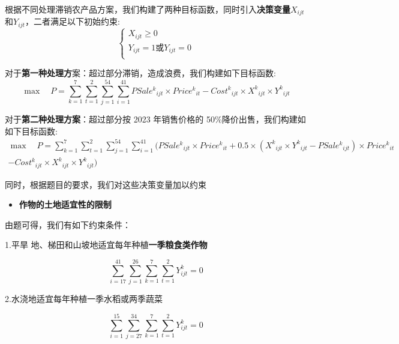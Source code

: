 \documentclass[withoutpreface,bwprint]{cumcmthesis} %
\begin{document}
根据不同处理滞销农产品方案，我们构建了两种目标函数，同时引入\textbf{决策变量}$X_{ijt}$和$Y_{ijt}$，二者满足以下初始约束:
\begin{equation}
	\begin{cases}
		X_{ijt}\geqslant 0\\
		Y_{ijt}=1\text{或}Y_{ijt}=0\\
	\end{cases}
\end{equation}

对于\textbf{第一种处理方}案：超过部分滞销，造成浪费，我们构建如下目标函数:
\begin{equation}
\max \quad P=\sum_{k=1}^7{\sum_{t=1}^2{\sum_{j=1}^{54}{\sum_{i=1}^{41}{{PSale^k}_{ijt}\times {Price^k}_{it}-{Cost^k}_{ijt}}\times {X^k}_{ijt}\times {Y^k}_{ijt}}}}
\end{equation}

对于\textbf{第}\textbf{二种处理方案}：超过部分按 2023 年销售价格的 50$\%$降价出售，我们构建如如下目标函数:
\begin{equation}
	\begin{split}
\max \quad P=\sum_{k=1}^7{\sum_{t=1}^2{\sum_{j=1}^{54}{\sum_{i=1}^{41}{(}}}}{PSale^k}_{ijt}\times {Price^k}_{it}+0.5\times ({X^k}_{ijt}\times {Y^k}_{ijt}-{PSale^k}_{ijt})\times {Price^k}_{it}
\\
-{Cost^k}_{ijt}\times {X^k}_{ijt}\times {Y^k}_{ijt})
	\end{split}
\end{equation}

同时，根据题目的要求，我们对这些决策变量加以约束

\begin{itemize}
	\item \textbf{作物的土地适宜性的限制}
\end{itemize}

	由题可得，我们有如下约束条件：
	
	1.平旱
	地、梯田和山坡地适宜每年种植\textbf{一季粮食类作物}
	
	\begin{equation}
		\sum_{i=17}^{41}{\sum_{j=1}^{26}{\sum_{k=1}^7{\sum_{t=1}^2{{Y^k_{ijt}}=0}}}}
	\end{equation}
	
	2.水浇地适宜每年种植一季水稻或两季蔬菜
	
	
	\begin{equation}
		\sum_{i=1}^{15}{\sum_{j=27}^{34}{\sum_{k=1}^7{\sum_{t=1}^2{{Y^k_{ijt}}=0}}}}
	\end{equation}
	
\end{document}
